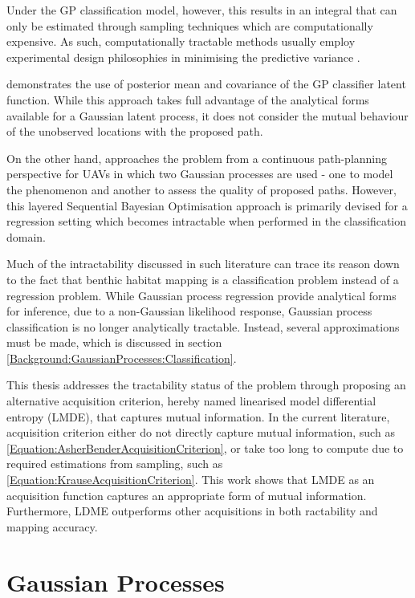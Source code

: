 		Under the GP classification model, however, this results in an integral that can only be estimated through sampling techniques which are computationally expensive. As such, computationally tractable methods usually employ experimental design philosophies in minimising the predictive variance \citep{AsherBender}.
		
		\cite{Kapoor} demonstrates the use of posterior mean and covariance of the GP classifier latent function. While this approach takes full advantage of the analytical forms available for a Gaussian latent process, it does not consider the mutual behaviour of the unobserved locations with the proposed path.
		
		On the other hand, \cite{Roman:SequentialBayesianOptimisation} approaches the problem from a continuous path-planning perspective for UAVs in which two Gaussian processes are used - one to model the phenomenon and another to assess the quality of proposed paths. However, this layered Sequential Bayesian Optimisation approach is primarily devised for a regression setting which becomes intractable when performed in the classification domain.
		
		Much of the intractability discussed in such literature can trace its reason down to the fact that benthic habitat mapping is a classification problem instead of a regression problem. While Gaussian process regression provide analytical forms for inference, due to a non-Gaussian likelihood response, Gaussian process classification is no longer analytically tractable. Instead, several approximations must be made, which is discussed in section \ref{Background:GaussianProcesses:Classification}.
		
		This thesis addresses the tractability status of the problem through proposing an alternative acquisition criterion, hereby named linearised model differential entropy (LMDE), that captures mutual information. In the current literature, acquisition criterion either do not directly capture mutual information, such as \eqref{Equation:AsherBenderAcquisitionCriterion}, or take too long to compute due to required estimations from sampling, such as \eqref{Equation:KrauseAcquisitionCriterion}. This work shows that LMDE as an acquisition function captures an appropriate form of mutual information. Furthermore, LDME outperforms other acquisitions in both ractability and mapping accuracy.
		
	\section{Gaussian Processes}
	\label{Background:GaussianProcesses}
	
